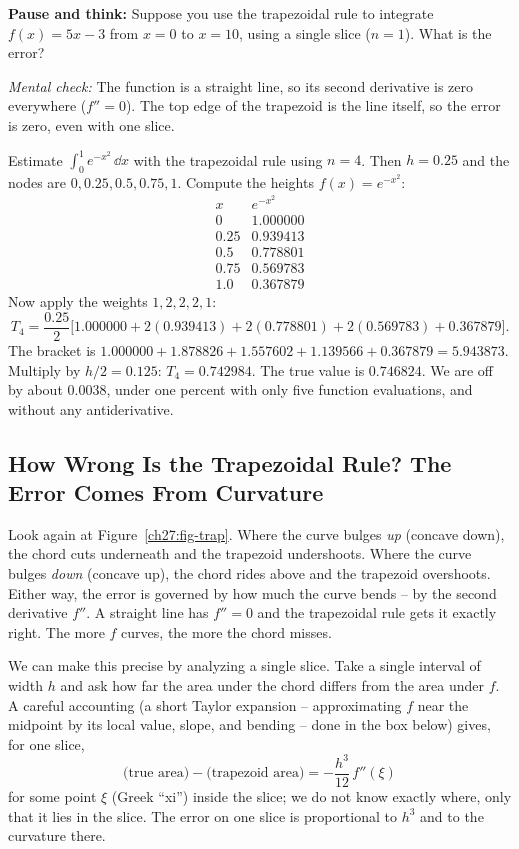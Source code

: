 \begin{recoverybox}
\textbf{Pause and think:} Suppose you use the trapezoidal rule to integrate $f(x) = 5x - 3$ from $x = 0$ to $x = 10$, using a single slice ($n = 1$). What is the error?

\emph{Mental check:} The function is a straight line, so its second derivative is zero everywhere ($f'' = 0$). The top edge of the trapezoid is the line itself, so the error is zero, even with one slice.
\end{recoverybox}

\begin{labbox}
Estimate $\int_0^1 e^{-x^2}\,\dd x$ with the trapezoidal rule using $n=4$. Then $h = 0.25$ and the nodes are $0, 0.25, 0.5, 0.75, 1$. Compute the heights $f(x) = e^{-x^2}$:
\[
\begin{array}{c|c}
x & e^{-x^2}\\\hline
0    & 1.000000\\
0.25 & 0.939413\\
0.5  & 0.778801\\
0.75 & 0.569783\\
1.0  & 0.367879
\end{array}
\]
Now apply the weights $1,2,2,2,1$:
\[
T_4 = \frac{0.25}{2}\Big[1.000000 + 2(0.939413) + 2(0.778801) + 2(0.569783) + 0.367879\Big].
\]
The bracket is $1.000000 + 1.878826 + 1.557602 + 1.139566 + 0.367879 = 5.943873$. Multiply by $h/2 = 0.125$: $T_4 = 0.742984$. The true value is $0.746824$. We are off by about $0.0038$, under one percent with only five function evaluations, and without any antiderivative.
\end{labbox}

\subsection{How Wrong Is the Trapezoidal Rule? The Error Comes From Curvature}
\label{ch27:traperror}

Look again at Figure~\ref{ch27:fig-trap}. Where the curve bulges \emph{up} (concave down), the chord cuts underneath and the trapezoid undershoots. Where the curve bulges \emph{down} (concave up), the chord rides above and the trapezoid overshoots. Either way, the error is governed by how much the curve bends -- by the second derivative $f''$. A straight line has $f'' = 0$ and the trapezoidal rule gets it exactly right. The more $f$ curves, the more the chord misses.

We can make this precise by analyzing a single slice. Take a single interval of width $h$ and ask how far the area under the chord differs from the area under $f$. A careful accounting (a short Taylor expansion -- approximating $f$ near the midpoint by its local value, slope, and bending -- done in the box below) gives, for one slice,
\[
\text{(true area)} - \text{(trapezoid area)} = -\frac{h^3}{12}\, f''(\xi)
\]
for some point $\xi$ (Greek ``xi'') inside the slice; we do not know exactly where, only that it lies in the slice. The error on one slice is proportional to $h^3$ and to the curvature there.

